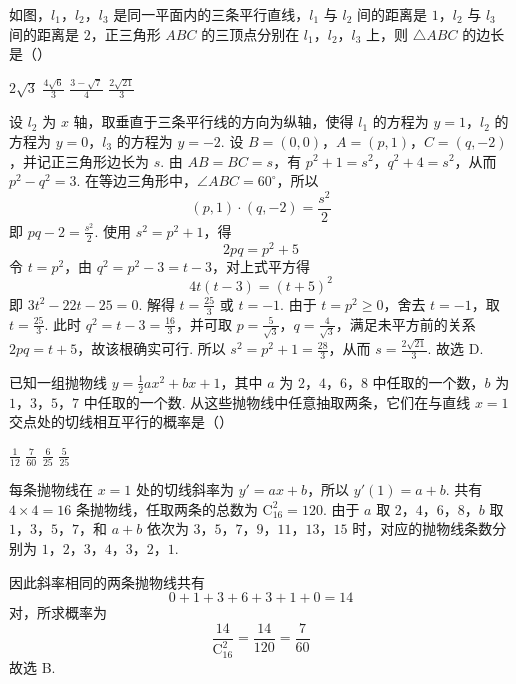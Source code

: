 \begin{problem}
如图，\(l_{1}\)，\(l_{2}\)，\(l_{3}\) 是同一平面内的三条平行直线，\(l_{1}\) 与 \(l_{2}\) 间的距离是 \(1\)，\(l_{2}\) 与 \(l_{3}\) 间的距离是 \(2\)，正三角形 \(ABC\) 的三顶点分别在 \(l_{1}\)，\(l_{2}\)，\(l_{3}\) 上，则 \(\triangle ABC\) 的边长是（\quad）


\choices
    {\(2\sqrt{3}\)}
    {\(\frac{4\sqrt{6}}{3}\)}
    {\(\frac{3-\sqrt{7}}{4}\)}
    {\(\frac{2\sqrt{21}}{3}\)}
\end{problem}


\begin{solution}
设 \(l_2\) 为 \(x\) 轴，取垂直于三条平行线的方向为纵轴，使得 \(l_1\) 的方程为 \(y=1\)，\(l_2\) 的方程为 \(y=0\)，\(l_3\) 的方程为 \(y=-2\).
设 \(B=(0,0)\)，\(A=(p,1)\)，\(C=(q,-2)\)，并记正三角形边长为 \(s\). 由 \(AB=BC=s\)，有 \(p^2+1=s^2\)，\(q^2+4=s^2\)，从而 \(p^2-q^2=3\).
在等边三角形中，\(\angle ABC=60^\circ\)，所以
\[
(p,1)\cdot(q,-2)=\frac{s^2}{2}
\]
即 \(pq-2=\frac{s^2}{2}\). 使用 \(s^2=p^2+1\)，得
\[
2pq=p^2+5
\]
令 \(t=p^2\)，由 \(q^2=p^2-3=t-3\)，对上式平方得
\[
4t(t-3)=(t+5)^2
\]
即 \(3t^2-22t-25=0\). 解得 \(t=\frac{25}{3}\) 或 \(t=-1\). 由于 \(t=p^2\geqslant0\)，舍去 \(t=-1\)，取 \(t=\frac{25}{3}\). 此时 \(q^2=t-3=\frac{16}{3}\)，并可取 \(p=\frac{5}{\sqrt3}\)，\(q=\frac{4}{\sqrt3}\)，满足未平方前的关系 \(2pq=t+5\)，故该根确实可行.
所以 \(s^2=p^2+1=\frac{28}{3}\)，从而 \(s=\frac{2\sqrt{21}}{3}\).
故选 D.
\end{solution}

\begin{problem}
已知一组抛物线 \( y = \frac{1}{2}ax^2 + bx + 1 \)，其中 \(a\) 为 \(2\)，\(4\)，\(6\)，\(8\) 中任取的一个数，\(b\) 为 \(1\)，\(3\)，\(5\)，\(7\) 中任取的一个数. 从这些抛物线中任意抽取两条，它们在与直线 \(x = 1\) 交点处的切线相互平行的概率是（\quad）

\choices
    {\(\frac{1}{12}\)}
    {\(\frac{7}{60}\)}
    {\(\frac{6}{25}\)}
    {\(\frac{5}{25}\)}
\end{problem}


\begin{solution}
每条抛物线在 \(x=1\) 处的切线斜率为 \(y'=ax+b\)，所以 \(y'(1)=a+b\).
共有 \(4\times4=16\) 条抛物线，任取两条的总数为 \(\mathrm C_{16}^{2}=120\). 由于 \(a\) 取 \(2\)，\(4\)，\(6\)，\(8\)，\(b\) 取 \(1\)，\(3\)，\(5\)，\(7\)，和 \(a+b\) 依次为 \(3\)，\(5\)，\(7\)，\(9\)，\(11\)，\(13\)，\(15\) 时，对应的抛物线条数分别为 \(1\)，\(2\)，\(3\)，\(4\)，\(3\)，\(2\)，\(1\).

因此斜率相同的两条抛物线共有
\[
0+1+3+6+3+1+0=14
\]
对，所求概率为
\[
\frac{14}{\mathrm C_{16}^{2}}=\frac{14}{120}=\frac7{60}
\]
故选 B.
\end{solution}

